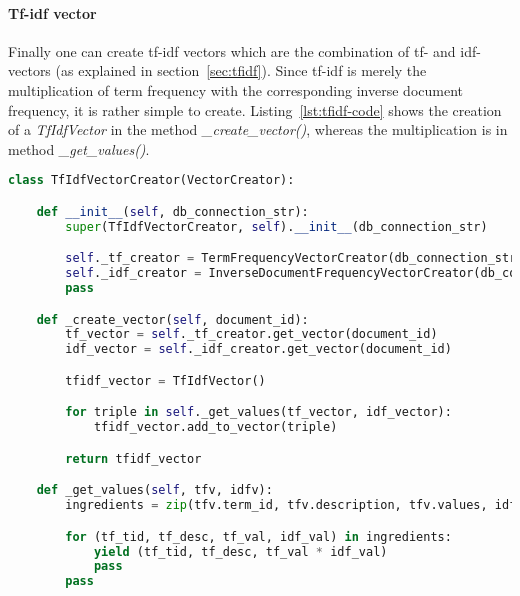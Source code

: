\FloatBarrier

\paragraph{Tf-idf vector}
Finally one can create tf-idf vectors which are the combination of tf- and idf-vectors (as explained in section~\ref{sec:tfidf}).
Since tf-idf is merely the multiplication of term frequency with the corresponding inverse document frequency, it is rather simple to create.
Listing~\ref{lst:tfidf-code} shows the creation of a \textit{TfIdfVector} in the method \textit{\_create\_vector()}, whereas the multiplication is in method \textit{\_get\_values()}.

\begin{lstlisting}[language=Python,caption={Python code for calculating tfidf-vectos on basis on tf- and idf-vectors},label={lst:tfidf-code},float=h]
class TfIdfVectorCreator(VectorCreator):

    def __init__(self, db_connection_str):
        super(TfIdfVectorCreator, self).__init__(db_connection_str)

        self._tf_creator = TermFrequencyVectorCreator(db_connection_str)
        self._idf_creator = InverseDocumentFrequencyVectorCreator(db_connection_str)
        pass

    def _create_vector(self, document_id):
        tf_vector = self._tf_creator.get_vector(document_id)
        idf_vector = self._idf_creator.get_vector(document_id)

        tfidf_vector = TfIdfVector()

        for triple in self._get_values(tf_vector, idf_vector):
            tfidf_vector.add_to_vector(triple)

        return tfidf_vector

    def _get_values(self, tfv, idfv):
        ingredients = zip(tfv.term_id, tfv.description, tfv.values, idfv.values)

        for (tf_tid, tf_desc, tf_val, idf_val) in ingredients:
            yield (tf_tid, tf_desc, tf_val * idf_val)
            pass
        pass
\end{lstlisting}


